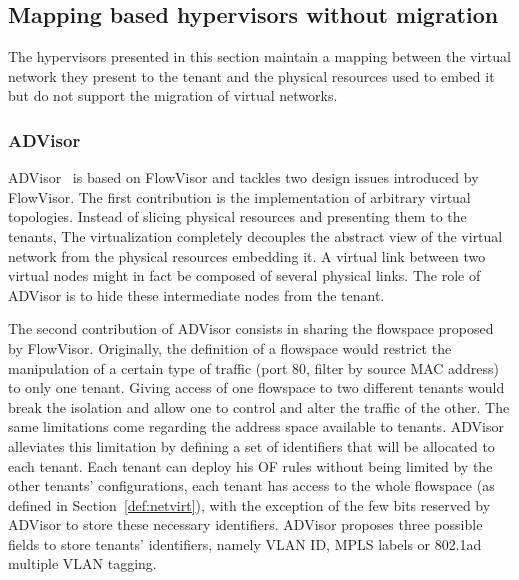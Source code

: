 \subsection{Mapping based hypervisors without migration}
The hypervisors presented in this section maintain a mapping between the virtual network they present to the tenant and the physical resources used to embed it but do not support the migration of virtual networks.

\subsubsection{ADVisor}
ADVisor~\cite{ADVisor-Salvadori2012} is based on FlowVisor and tackles two design issues introduced by FlowVisor.
The first contribution is the implementation of arbitrary virtual topologies.
Instead of slicing physical resources and presenting them to the tenants, 
The virtualization completely decouples the abstract view of the virtual network from the physical resources embedding it.
A virtual link between two virtual nodes might in fact be composed of several physical links. The role of ADVisor is to hide these intermediate nodes from the tenant.

The second contribution of ADVisor consists in sharing the flowspace proposed by FlowVisor.
Originally, the definition of a flowspace would restrict the manipulation of a certain type of traffic (\eg port 80, filter by source MAC address) to only one tenant.
Giving access of one flowspace to two different tenants would break the isolation and allow one to control and alter the traffic of the other.
The same limitations come regarding the address space available to tenants.
ADVisor alleviates this limitation by defining a set of identifiers that will be allocated to each tenant. Each tenant can deploy his OF rules without being limited by the other tenants' configurations, \ie each tenant has access to the whole flowspace (as defined in Section~\ref{def:netvirt}), with the exception of the few bits reserved by ADVisor to store these necessary identifiers.
ADVisor proposes three possible fields to store tenants' identifiers, namely VLAN ID, MPLS labels or 802.1ad multiple VLAN tagging.

